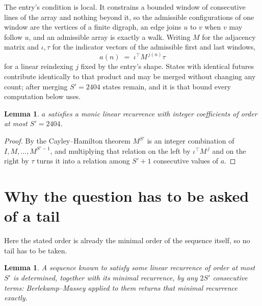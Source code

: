 \documentclass[11pt,a4paper]{article}
\theoremstyle{plain}
\newtheorem{lemma}[theorem]{Lemma}
\theoremstyle{definition}
\begin{document}
The entry's condition is local. It constrains a bounded window of consecutive lines of the
array and nothing beyond it, so the admissible configurations of one window are the vertices of
a finite digraph, an edge joins $u$ to $v$ when $v$ may follow $u$, and an admissible array is
exactly a walk. Writing $M$ for the adjacency matrix and $\iota,\tau$ for the indicator vectors
of the admissible first and last windows,
\[
a(n)\;=\;\iota^{\!\top}M^{\,j(n)}\tau
\]
for a linear reindexing $j$ fixed by the entry's shape. States with identical futures
contribute identically to that product and may be merged without changing any count; after
merging $S'=2404$ states remain, and it is that bound every computation below uses.

\begin{lemma}\label{lem:cf}
$a$ satisfies a monic linear recurrence with integer coefficients of order at most $S'=2404$.
\end{lemma}

\begin{proof}
By the Cayley--Hamilton theorem $M^{S'}$ is an integer combination of $I,M,\dots,M^{S'-1}$,
and multiplying that relation on the left by $\iota^{\!\top}M^{\,j}$ and on the right by
$\tau$ turns it into a relation among $S'+1$ consecutive values of $a$.
\end{proof}

\section{Why the question has to be asked of a tail}

Here the stated order is already the minimal order of the sequence itself, so no tail has to be taken.

\begin{lemma}\label{lem:bm}
A sequence known to satisfy some linear recurrence of order at most $S'$ is determined,
together with its minimal recurrence, by any $2S'$ consecutive terms: Berlekamp--Massey applied
to them returns that minimal recurrence exactly.
\end{lemma}
\end{document}
